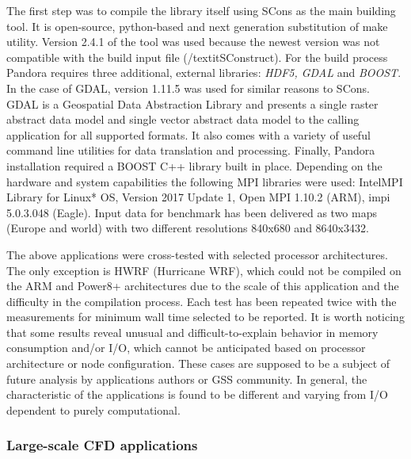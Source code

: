 The first step was to compile the library itself using SCons \cite{SCONS} as the main building tool.  It is open-source, python-based and next generation substitution of make utility. Version 2.4.1 of the tool  was used because the newest version was not compatible with the build input file (/textit{SConstruct}). For the build process Pandora \cite{2014:pandora} requires three additional, external libraries: \textit{HDF5, GDAL} and \textit{BOOST}. In the case of GDAL, version 1.11.5 was used for similar reasons to SCons. GDAL is a Geospatial Data Abstraction Library and presents a single raster abstract data model and single vector abstract data model to the calling application for all supported formats. It also comes with a variety of useful command line utilities for data translation and processing. Finally, Pandora installation required a BOOST C++ library built in place.
Depending on the hardware and system capabilities the following MPI libraries were used: Intel\textregistered MPI Library for Linux* OS, Version 2017 Update 1, Open MPI 1.10.2 (ARM), impi 5.0.3.048 (Eagle).
Input data for benchmark has been delivered as two maps (Europe and world) with two different resolutions 840x680 and 8640x3432. 

The above applications were cross-tested with selected processor architectures. The only exception is HWRF (Hurricane WRF), which could not be compiled on the ARM and Power8+ architectures due to the scale of this application and the difficulty in the compilation process.
Each test has been repeated twice with the measurements for minimum wall time selected to be reported. It is worth noticing that some results reveal unusual and difficult-to-explain behavior in memory consumption and/or I/O, which cannot be anticipated based on processor architecture or node configuration. These cases are supposed to be a subject of future analysis by applications authors or GSS community.
In general, the characteristic of the applications is found to be different and varying from I/O dependent to purely computational.
\fi

\subsubsection{Large-scale CFD applications}

